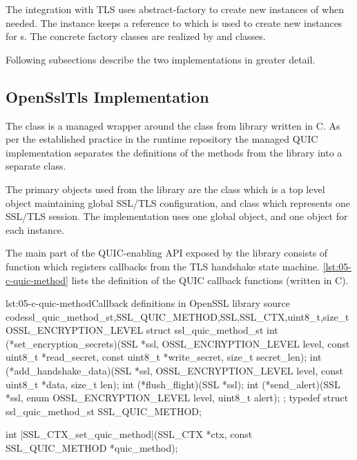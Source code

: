 The integration with TLS uses \gls{abstract-factory} to create new instances of \ITls{} when needed.
The \ManagedQuicImplementationProvider{} instance keeps a reference to \QuicTlsProvider{} which is
used to create new \ITls{} instances for \ManagedQuicConnection{}s. The concrete factory classes are
realized by \OpenSslQuicTlsProvider{} and \MockQuicTlsProvider{} classes.

Following subsections describe the two \ITls{} implementations in greater detail.

\subsection{OpenSslTls Implementation}

The \OpenSslTls{} class is a managed wrapper around the \SSL{} class from \libopenssl{} library
written in C. As per the established practice in the \dotnet{} runtime repository the managed QUIC
implementation separates the definitions of the  methods from the \libopenssl{}
library into a separate  class.

The primary objects used from the \libopenssl{} library are the \SSLCTX{} class which is a top level
object maintaining global SSL/TLS configuration, and \SSL{} class which represents one SSL/TLS
session. The \OpenSslTls{} implementation uses one global \SSLCTX{} object, and one \SSL{} object
for each \OpenSslTls{} instance.

The main part of the QUIC-enabling API exposed by the \libopenssl{} library consists of
 function which registers callbacks from the TLS handshake state
machine. \autoref{lst:05-c-quic-method} lists the definition of the \libopenssl{} QUIC callback
functions (written in C).

\begin{myListingC}{lst:05-c-quic-method}{Callback definitions in OpenSSL library source code}{ssl_quic_method_st,SSL_QUIC_METHOD,SSL,SSL_CTX,uint8_t,size_t}{OSSL_ENCRYPTION_LEVEL}
struct ssl_quic_method_st {
    int (*set_encryption_secrets)(SSL *ssl, OSSL_ENCRYPTION_LEVEL level,
                                  const uint8_t *read_secret,
                                  const uint8_t *write_secret,
                                  size_t secret_len);
    int (*add_handshake_data)(SSL *ssl, OSSL_ENCRYPTION_LEVEL level,
                              const uint8_t *data, size_t len);
    int (*flush_flight)(SSL *ssl);
    int (*send_alert)(SSL *ssl, enum OSSL_ENCRYPTION_LEVEL level,
                      uint8_t alert);
};
typedef struct ssl_quic_method_st SSL_QUIC_METHOD;

int |SSL_CTX_set_quic_method|(SSL_CTX *ctx, const SSL_QUIC_METHOD *quic_method);
\end{myListingC}

